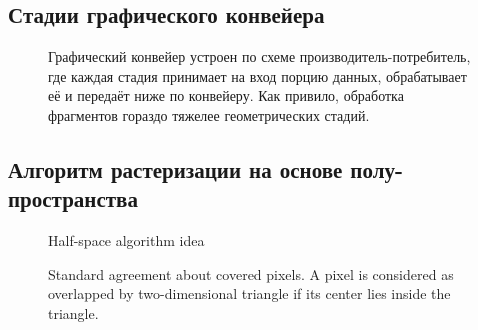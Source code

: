 \documentclass[12pt,subf,href,colorlinks=true]{article}
\begin{document}
\subsection{Стадии графического конвейера}

\begin{figure}[h]
	\caption{Графический конвейер устроен по схеме производитель-потребитель, где каждая стадия принимает на вход порцию данных, обрабатывает её и передаёт ниже по конвейеру. Как привило, обработка фрагментов гораздо тяжелее геометрических стадий.}
	\label{fig:prodcons}
\end{figure}

\subsection{Алгоритм растеризации на основе полу-пространства}

\begin{figure}[htb]
	\caption{Half-space algorithm idea}
	\label{fig:halfspace}
\end{figure}

\begin{figure}[htb]
	\caption{Standard agreement about covered pixels.  A pixel is considered as overlapped by two-dimensional triangle if its center lies inside the triangle.}
	\label{fig:coveragetest}
\end{figure}
\end{document}
